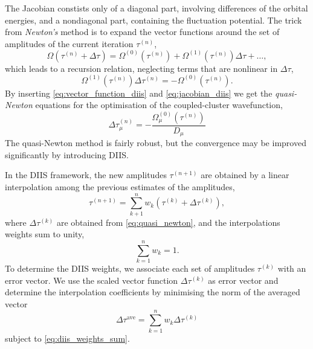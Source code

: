     The Jacobian constists only of a diagonal part, involving differences of the 
    orbital energies, and a nondiagonal part, containing the fluctuation potential.
    The trick from \emph{Newton's} method is to expand the vector functions around 
    the set of amplitudes of the current iteration $\tau^{(n)}$,
    \begin{equation}
        \Omega(\tau^{(n)} + \Delta\tau) = \Omega^{(0)}(\tau^{(n)})
            + \Omega^{(1)}(\tau^{(n)})\Delta \tau + \dots,
    \end{equation}
    which leads to a recursion relation, neglecting terms that are nonlinear in
    $\Delta \tau$,
    \begin{equation}
        \Omega^{(1)}(\tau^{(n)})\Delta \tau^{(n)} = - \Omega^{(0)}(\tau^{(n)}).
    \end{equation}
    By inserting \autoref{eq:vector_function_diis} and \autoref{eq:jacobian_diis} 
    we get the \emph{quasi-Newton} equations for the optimisation of the 
    coupled-cluster wavefunction,
    \begin{equation}
        \label{eq:quasi_newton}
        \Delta \tau^{(n)}_\mu = - \frac{\Omega^{(0)}_\mu(\tau^{(n)})}{D_\mu}
    \end{equation}
    The quasi-Newton method is fairly robust, but the convergence may be improved 
    significantly by introducing DIIS.

    In the DIIS framework\cite{pulay1980convergence}, the new amplitudes 
    $\tau^{(n+1)}$ are obtained by a linear interpolation among the previous 
    estimates of the amplitudes,
    \begin{equation}
        \tau^{(n+1)} = \sum_{k+1}^n w_k(\tau^{(k)} + \Delta\tau^{(k)}),
    \end{equation}
    where $\Delta\tau^{(k)}$ are obtained from \autoref{eq:quasi_newton}, and 
    the interpolations weights sum to unity,
    \begin{equation*}
        \label{eq:diis_weights_sum}
        \sum_{k=1}^n w_k = 1.
    \end{equation*}
    To determine the DIIS weights, we associate each set of amplitudes $\tau^{(k)}$ 
    with an error vector. We use the scaled vector function $\Delta\tau^{(k)}$ as 
    error vector and determine the interpolation coefficients by minimising the norm of 
    the averaged vector
    \begin{equation}
        \Delta \tau^{\text{ave}} = \sum_{k=1}^n w_k \Delta \tau^{(k)}
    \end{equation}
    subject to \autoref{eq:diis_weights_sum}.

